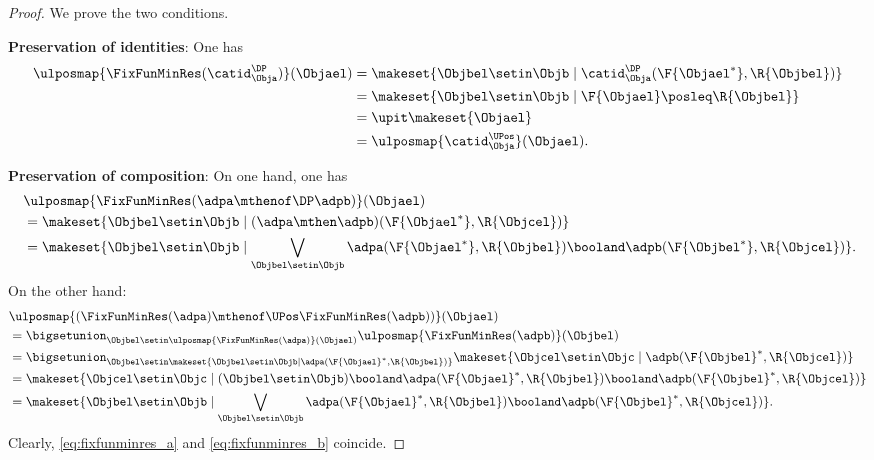 \begin{proof}
    We prove the two conditions.

    \textbf{Preservation of identities}:
    One has
    \begin{equation*}
        \begin{aligned}
            \ulposmap{\FixFunMinRes(\catid_{\Obja}^{\DP})}(\Objael) & =\makeset{ \Objbel\setin \Objb\mid \catid_{\Obja}^{\DP}(\F{\Objael^*},\R{\Objbel})} \\
                                                                    & =\makeset{ \Objbel \setin \Objb\mid \F{\Objael}\posleq\R{\Objbel}} \\
                                                                    & =\upit \makeset{ \Objael} \\
                                                                    & =\ulposmap{\catid_{\Obja}^{\UPos}}(\Objael).
        \end{aligned}
    \end{equation*}

    \textbf{Preservation of composition}:
    On one hand, one has
    \begin{equation}
        \label{eq:fixfunminres_a}
        \begin{aligned}
            ~ & \ulposmap{\FixFunMinRes(\adpa\mthenof\DP \adpb)}(\Objael) \\
              & =\makeset{ \Objbel\setin \Objb\mid (\adpa\mthen \adpb)(\F{\Objael^*},\R{\Objcel})} \\
              & =\makeset{ \Objbel\setin \Objb\mid \bigvee_{\Objbel \setin \Objb}\adpa(\F{\Objael^*},\R{\Objbel})\booland \adpb(\F{\Objbel^*},\R{\Objcel})}.
        \end{aligned}
    \end{equation}
    On the other hand:
    \begin{equation}
        \label{eq:fixfunminres_b}
        \begin{aligned}
             & \ulposmap{(\FixFunMinRes(\adpa)\mthenof\UPos \FixFunMinRes(\adpb))}(\Objael) \\
             & =\bigsetunion_{\Objbel \setin \ulposmap{\FixFunMinRes(\adpa)}(\Objael)}\ulposmap{\FixFunMinRes(\adpb)}(\Objbel) \\
             & =\bigsetunion_{\Objbel \setin \makeset{ \Objbel \setin \Objb \mid \adpa(\F{\Objael}^*,\R{\Objbel})}} \makeset{\Objcel \setin \Objc \mid \adpb(\F{\Objbel}^*,\R{\Objcel})} \\
             & =\makeset{\Objcel\setin \Objc \mid (\Objbel \setin \Objb)\booland \adpa(\F{\Objael}^*,\R{\Objbel})\booland \adpb(\F{\Objbel}^*,\R{\Objcel})} \\
             & =\makeset{ \Objbel\setin \Objb\mid \bigvee_{\Objbel \setin \Objb}\adpa(\F{\Objael}^*,\R{\Objbel})\booland \adpb(\F{\Objbel}^*,\R{\Objcel})}.
        \end{aligned}
    \end{equation}
    Clearly, \cref{eq:fixfunminres_a} and \cref{eq:fixfunminres_b} coincide.
\end{proof}

